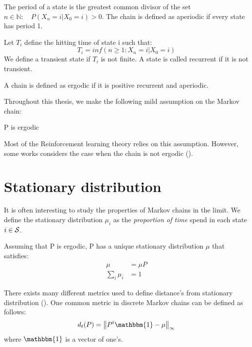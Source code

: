 \begin{definition}
The period of a state is the greatest common divisor of the set {$n \in  \mathbb{N} : \quad P(X_n=i|X_0=i) > 0$}. The chain is defined as aperiodic if every state has period 1.
\end{definition}
\begin{definition}
Let $T_i$ define the hitting time of state i such that:
\begin{equation}
    T_i = inf(n \geq 1 : X_n = i | X_0 = i)
\end{equation}
We define a transient state if $T_i$ is not finite. A state is called recurrent if it is not transient.
\end{definition}
\begin{definition}
A chain is defined as ergodic if it is positive recurrent and aperiodic.
\end{definition}
Throughout this thesis, we make the following mild assumption on the Markov chain:
\begin{assumption}
P is ergodic
\end{assumption}
Most of the Reinforcement learning theory relies on this assumption. However, some works considers the case when the chain is not ergodic (\citep{leike2016nonparametric}).

\section{Stationary distribution}
It is often interesting to study the properties of Markov chains in the limit. We define the stationary distribution $\mu_i$ as the \emph{proportion of time} spend in each state $i \in \mathcal{S}$.
\begin{definition}
Assuming that P is ergodic, P has a unique stationary distribution $\mu$ that satisfies:
\begin{equation}
\begin{split}
    \mu &= \mu P \\
    \sum_i \mu_i &= 1
\end{split}
\end{equation}
\end{definition}
There exists many different metrics used to define distance's from stationary distribution (\citep{levin2017markov}). One common metric in discrete Markov chains can be defined as follows:
\begin{equation}
    d_t(P) = \norm{P^t \mathbbm{1} - \mu}_{ \infty } 
    \label{eq:d_markov}
\end{equation}
where $\mathbbm{1}$ is a vector of one's.
